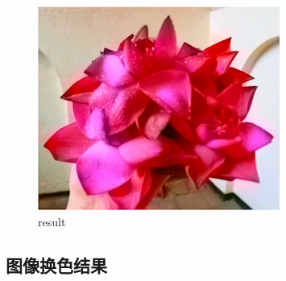 \documentclass{article}
\begin{document}
\begin{figure}[H]
{\begin{minipage}[t]{0.3\linewidth}
\centering
\includegraphics[width=\linewidth]{result_5.png}
\caption{result}
\end{minipage}
}%
\centering
\end{figure}

\subsection{图像换色结果}
\end{document}
